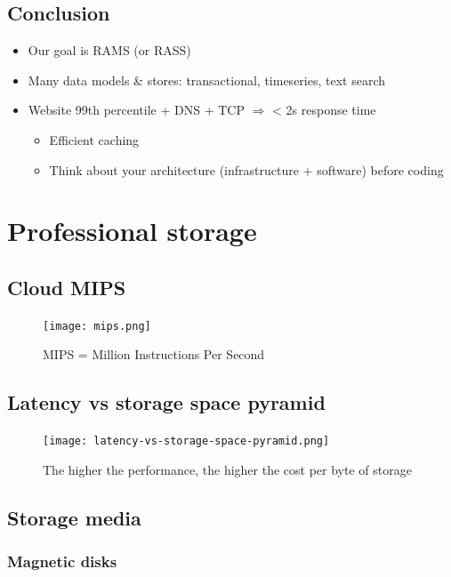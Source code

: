 \documentclass{article}
\begin{document}
\subsection{Conclusion}

\begin{itemize}
    \item Our goal is RAMS (or RASS)
    \item Many data models \& stores: transactional, timeseries, text search
    \item Website 99th percentile + DNS + TCP $\Rightarrow$ < 2s response time
    \begin{itemize}
        \item Efficient caching
        \item Think about your architecture (infrastructure + software) before coding
    \end{itemize}
\end{itemize}

\section{Professional storage}

\subsection{Cloud MIPS}

\begin{figure}[H]
    \centering
    \texttt{[image: mips.png]}
    \caption{MIPS = Million Instructions Per Second}
\end{figure}

\subsection{Latency vs storage space pyramid}

\begin{figure}[H]
    \centering
    \texttt{[image: latency-vs-storage-space-pyramid.png]}
    \caption{The higher the performance, the higher the cost per byte of storage}
\end{figure}

\subsection{Storage media}

\subsubsection{Magnetic disks}
\end{document}
